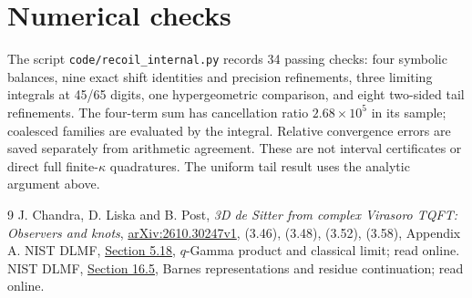 \documentclass[11pt,a4paper]{article}
\begin{document}
\section{Numerical checks}
The script \texttt{code/recoil\_internal.py} records 34 passing checks:
four symbolic balances, nine exact shift identities and precision
refinements, three limiting integrals at 45/65 digits, one
hypergeometric comparison, and eight two-sided tail refinements.
The four-term sum has cancellation ratio \(2.68\times10^5\) in its
sample; coalesced families are evaluated by the integral.
Relative convergence errors are saved separately from arithmetic
agreement. These are not interval certificates or direct full
finite-\(\kappa\) quadratures. The uniform tail result uses the
analytic argument above.

\begin{thebibliography}{9}
 J. Chandra, D. Liska and B. Post,
\emph{3D de Sitter from complex Virasoro TQFT: Observers and knots},
\href{https://arxiv.org/html/2610.30247v1}{arXiv:2610.30247v1},
(3.46), (3.48), (3.52), (3.58), Appendix A.
 NIST DLMF,
\href{https://dlmf.nist.gov/5.18}{Section 5.18},
\(q\)-Gamma product and classical limit; read online.
 NIST DLMF,
\href{https://dlmf.nist.gov/16.5}{Section 16.5},
Barnes representations and residue continuation; read online.
\end{thebibliography}
\end{document}
